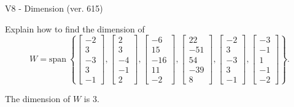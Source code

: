 \begin{exercise}
  \begin{exerciseTitle}V8 - Dimension (ver. 615)\end{exerciseTitle}
  \begin{exerciseStatement}
    Explain how to find the dimension of 
\[W=\mathrm{span}\ \left\{\left[\begin{array}{r}
-2 \\
3 \\
-3 \\
3 \\
-1
\end{array}\right] , \left[\begin{array}{r}
2 \\
3 \\
-4 \\
-1 \\
2
\end{array}\right] , \left[\begin{array}{r}
-6 \\
15 \\
-16 \\
11 \\
-2
\end{array}\right] , \left[\begin{array}{r}
22 \\
-51 \\
54 \\
-39 \\
8
\end{array}\right] , \left[\begin{array}{r}
-2 \\
3 \\
-3 \\
3 \\
-1
\end{array}\right] , \left[\begin{array}{r}
-3 \\
-1 \\
1 \\
-1 \\
-2
\end{array}\right]\right\}.\]



  \end{exerciseStatement}
  \begin{exerciseAnswer}
   The dimension of \(W\) is  \(3\).
  


  \end{exerciseAnswer}
\end{exercise}